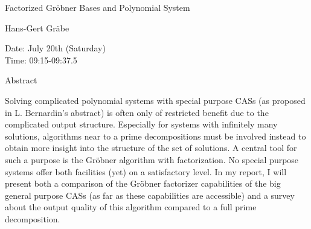\begin{center}
\LARGE
Factorized Gr\"obner Bases and Polynomial System
\end{center}

\begin{center}
\Large
Hans-Gert Gr\"abe 

\end{center}

\noindent
Date:  July 20th (Saturday) \\
Time:  09:15-09:37.5\\

\begin{center}
\large
Abstract
\end{center}

Solving complicated polynomial systems with special purpose CASs (as proposed in L.
Bernardin's abstract) is often only of restricted benefit due to the complicated output structure.
Especially for systems with infinitely many solutions, algorithms near to a prime decompositions
must be involved instead to obtain more insight into the structure of the set of solutions. A central
tool for such a purpose is the Gr\"obner algorithm with factorization. No special purpose systems
offer both facilities (yet) on a satisfactory level. In my report, I will present both a comparison of
the Gr\"obner factorizer capabilities of the big general purpose CASs (as far as these capabilities are
accessible) and a survey about the output quality of this algorithm compared to a full prime
decomposition. 

